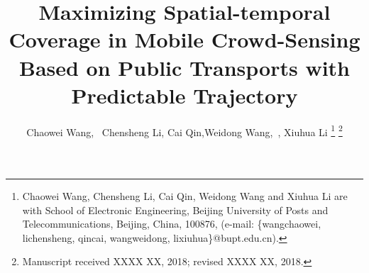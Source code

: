 \documentclass[journal]{IEEEtran}
\begin{document}
%
\title{Maximizing Spatial-temporal Coverage in Mobile Crowd-Sensing Based on Public Transports with Predictable Trajectory}
%
%
%

\author{Chaowei Wang,~
	    Chensheng Li, Cai Qin,Weidong Wang,~, Xiuhua Li
\thanks{Chaowei Wang, Chensheng Li, Cai Qin, Weidong Wang and Xiuhua Li are with School of Electronic Engineering, Beijing University of Posts and Telecommunications, Beijing, China, 100876, (e-mail: \{wangchaowei, lichensheng, qincai, wangweidong, lixiuhua\}@bupt.edu.cn).}%
\thanks{Manuscript received XXXX XX, 2018; revised XXXX XX, 2018.}}

% 
%
\end{document}
